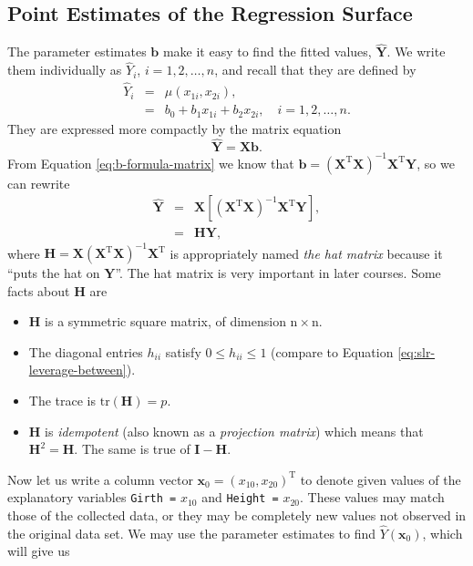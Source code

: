 \documentclass[captions=tableheading]{scrbook}
\begin{document}
\subsection{Point Estimates of the Regression Surface}
\label{sec-12-2-2}

\label{sub:mlr-point-est-regsurface}

The parameter estimates \(\mathbf{b}\) make it easy to find the fitted values, \(\hat{\mathbf{Y}}\). We write them individually as \(\hat{Y}_{i}\), \(i=1,2,\ldots,n\), and recall that they are defined by
\begin{eqnarray}
\hat{Y}_{i} & = & \hat{\mu}(x_{1i},x_{2i}),\\
 & = & b_{0}+b_{1}x_{1i}+b_{2}x_{2i},\quad i=1,2,\ldots,n.
\end{eqnarray}
They are expressed more compactly by the matrix equation
\begin{equation}
\hat{\mathbf{Y}}=\mathbf{X}\mathbf{b}.
\end{equation}
From Equation \ref{eq:b-formula-matrix} we know that \(\mathbf{b}=\left(\mathbf{X}^{\mathrm{T}}\mathbf{X}\right)^{-1}\mathbf{X}^{\mathrm{T}}\mathbf{Y}\), so we can rewrite
\begin{eqnarray}
\hat{\mathbf{Y}} & = & \mathbf{X}\left[\left(\mathbf{X}^{\mathrm{T}}\mathbf{X}\right)^{-1}\mathbf{X}^{\mathrm{T}}\mathbf{Y}\right],\\
 & = & \mathbf{H}\mathbf{Y},
\end{eqnarray}
where \(\mathbf{H}=\mathbf{X}\left(\mathbf{X}^{\mathrm{T}}\mathbf{X}\right)^{-1}\mathbf{X}^{\mathrm{T}}\) is appropriately named \emph{the hat matrix} because it ``puts the hat on \(\mathbf{Y}\)''. The hat matrix is very important in later courses. Some facts about \(\mathbf{H}\) are
\begin{itemize}
\item \(\mathbf{H}\) is a symmetric square matrix, of dimension \(\mathrm{n}\times\mathrm{n}\).
\item The diagonal entries \(h_{ii}\) satisfy \(0\leq h_{ii}\leq1\) (compare to Equation \ref{eq:slr-leverage-between}).
\item The trace is \(\mathrm{tr}(\mathbf{H})=p\).
\item \(\mathbf{H}\) is \emph{idempotent} (also known as a \emph{projection matrix}) which means that \(\mathbf{H}^{2}=\mathbf{H}\). The same is true of \(\mathbf{I}-\mathbf{H}\).
\end{itemize}

Now let us write a column vector \(\mathbf{x}_{0}=(x_{10},x_{20})^{\mathrm{T}}\) to denote given values of the explanatory variables \texttt{Girth =} \(x_{10}\) and \texttt{Height =} \(x_{20}\). These values may match those of the collected data, or they may be completely new values not observed in the original data set. We may use the parameter estimates to find \(\hat{Y}(\mathbf{x}_{0})\), which will give us
\end{document}
